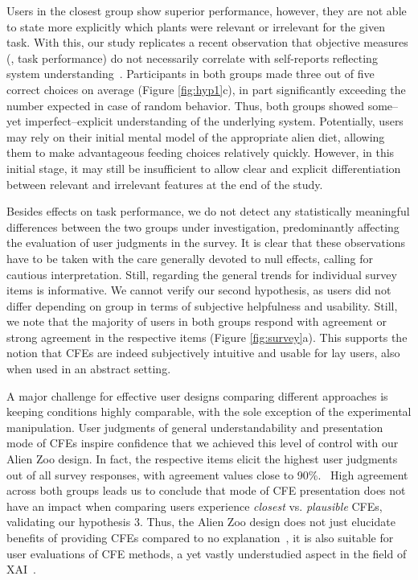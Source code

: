Users in the closest group show superior performance, however, they are not able to state more explicitly which plants were relevant or irrelevant for the given task. 
With this, our study replicates a recent observation that objective measures (\ie, task performance) do not necessarily correlate with self-reports reflecting system understanding~\citep{van_der_waa_evaluating_2021}.
Participants in both groups made three out of five correct choices on average (Figure \ref{fig:hyp1}c), in part significantly exceeding the number expected in case of random behavior.
Thus, both groups showed some--yet imperfect--explicit understanding of the underlying system.
Potentially, users may rely on their initial mental model of the appropriate alien diet, allowing them to make advantageous feeding choices relatively quickly. However, in this initial stage, it may still be insufficient to allow clear and explicit differentiation between relevant and irrelevant features at the end of the study.

Besides effects on task performance, we do not detect any statistically meaningful differences between the two groups under investigation, predominantly affecting the evaluation of user judgments in the survey. 
It is clear that these observations have to be taken with the care generally devoted to null effects, calling for cautious interpretation. 
Still, regarding the general trends for individual survey items is informative.
We cannot verify our second hypothesis, as users did not differ depending on group in terms of subjective helpfulness and usability. 
Still, we note that the majority of users in both groups respond with agreement or strong agreement in the respective items (Figure \ref{fig:survey}a).
This supports the notion that \glspl{CFE} are indeed subjectively intuitive and usable for lay users, also when used in an abstract setting.

A major challenge for effective user designs comparing different approaches is keeping conditions highly comparable, with the sole exception of the experimental manipulation.
User judgments of general understandability and presentation mode of \glspl{CFE} inspire confidence that we achieved this level of control with our Alien Zoo design. 
In fact, the respective items elicit the highest user judgments out of all survey responses, with agreement values close to 90\%.%
~High agreement across both groups leads us to conclude that mode of \gls{CFE} presentation does not have an impact when comparing users experience \textit{closest} vs. \textit{plausible} \glspl{CFE}, validating our hypothesis 3.
Thus, the Alien Zoo design does not just elucidate benefits of providing \glspl{CFE} compared to no explanation~\citep{IAZ ARXIV}, it is also suitable for user evaluations of \gls{CFE} methods, a yet vastly understudied aspect in the field of \gls{XAI}~\citep{keane_if_2021}.

